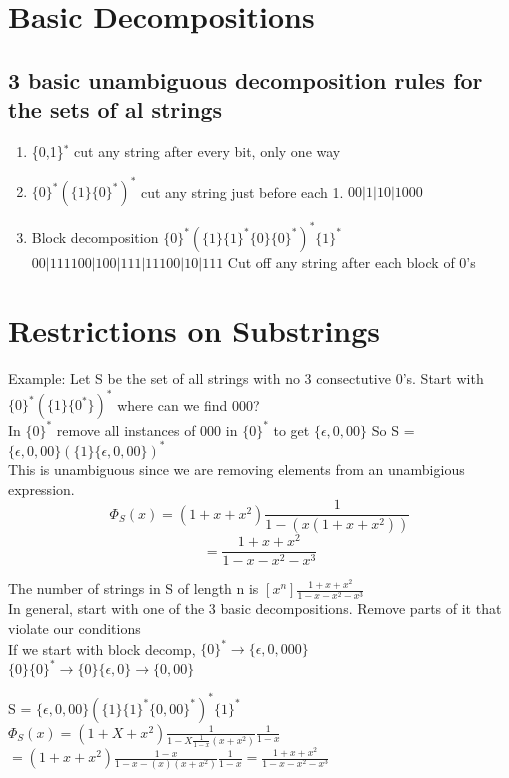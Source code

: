 \documentclass[12pt]{article}
\begin{document}
	
	\section*{Basic Decompositions}
	
	\subsection*{3 basic unambiguous decomposition rules for the sets of al strings}
	
	\begin{enumerate}
		\item \{0,1\}$^*$ cut any string after every bit, only one way
		\item $\{0\}^*(\{1\}\{0\}^*)^*$ cut any string just before each 1. $00 | 1 | 10 | 1000$
		\item Block decomposition $\{0\}^*(\{1\}\{1\}^*\{0\}\{0\}^*)^*\{1\}^*$ $00 | 1111 00 | 100 | 111 | 11100| 10 | 111$ Cut off any string after each block of 0's
	\end{enumerate}
	
	\section*{Restrictions on Substrings}
	
	Example: Let S be the set of all strings with no 3 consectutive 0's. Start with $\{0\}^*(\{1\}\{0^*\})^*$ where can we find 000?\\
	
	In $\{0\}^*$ remove all instances of 000 in $\{0\}^*$ to get $\{\epsilon, 0, 00 \}$ So S = $\{\epsilon, 0, 00 \}(\{1\}\{\epsilon,0,00 \})^*$\\
	
	This is unambiguous since we are removing elements from an unambigious expression.\\
	
	$$\Phi_S(x) = (1 + x + x^2) \frac{1}{1-(x(1+x + x^2))}$$
	$$ = \frac{1 + x + x^2}{1 - x - x^2 - x^3}$$
	
	The number of strings in S of length n is $[x^n]\frac{1+ x + x^2}{1 - x - x^2 - x^3}$\\
	
	In general, start with one of the 3 basic decompositions. Remove parts of it that violate our conditions\\
	
	If we start with block decomp, $\{0\}^* \rightarrow \{\epsilon, 0, 000 \}$\\
	$\{0\}\{0\}^* \rightarrow \{0\}\{\epsilon, 0 \} \rightarrow \{0,00\}$
	
	S = $\{\epsilon, 0, 00 \}(\{1\}\{1\}^*\{0,00\}^*)^*\{1\}^*$\\
	$\Phi_S(x) = (1+X+x^2)\frac{1}{1 - X \frac{1}{1-x}(x + x^2)} \frac{1}{1-x}$\\
	$= (1 + x + x^2) \frac{1-x}{1 - x - (x)(x + x^2)} \frac{1}{1-x} = \frac{1 + x + x^2}{1 - x - x^2 - x^3}$
	
\end{document}
